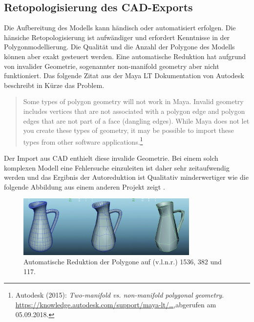 \label{subsec:RetopologisierungDesCAD-Exports}
\subsection{Retopologisierung des CAD-Exports}
Die Aufbereitung des Modells kann händisch oder automatisiert erfolgen. Die hänsiche Retopologisierung ist aufwändiger und erfordert Kenntnisse in der Polygonmodellierung. Die Qualität und die Anzahl der Polygone des Modells können aber exakt gesteuert werden. Eine automatische Reduktion hat aufgrund von invalider Geometrie, sogenannter non-manifold geometry aber nicht funktioniert. Das folgende Zitat aus der Maya LT Dokumentation von Autodesk beschreibt in Kürze das Problem. 

\begin{quote}
\glqq Some types of polygon geometry will not work in Maya. Invalid geometry includes vertices that are not associated with a polygon edge and polygon edges that are not part of a face (dangling edges). While Maya does not let you create these types of geometry, it may be possible to import these types from other software applications.\grqq\footnote{Autodesk  (2015): \textit{Two-manifold vs. non-manifold polygonal geometry}.\newline
\href{https://knowledge.autodesk.com/support/maya-lt/learn-explore/caas/CloudHelp/cloudhelp/2015/ENU/MayaLT/files/Polygons-overview-Twomanifold-vs--nonmanifold-polygonal-geometry-htm.html}{https://knowledge.autodesk.com/support/maya-lt/\dots},\newline abgerufen am 05.09.2018.} 
\end{quote}

Der Import aus CAD enthielt diese invalide Geometrie. Bei einem solch komplexen Modell eine Fehlersuche einzuleiten ist daher sehr zeitaufwendig werden und das Ergibnis der Autoreduktion ist Qualitativ minderwertiger wie die folgende Abbildung aus einem anderen Projekt zeigt . 

\begin{figure}[H]
	\centering
	\captionsetup{width=0.8\textwidth}
	\includegraphics[keepaspectratio, width=0.8\textwidth]{bildquellen/hp-zu-lp-automatisch}
	\caption{Automatische Reduktion der Polygone auf (v.l.n.r.) 1536, 382 und 117.}
	\label{fig:2.4}
\end{figure}

